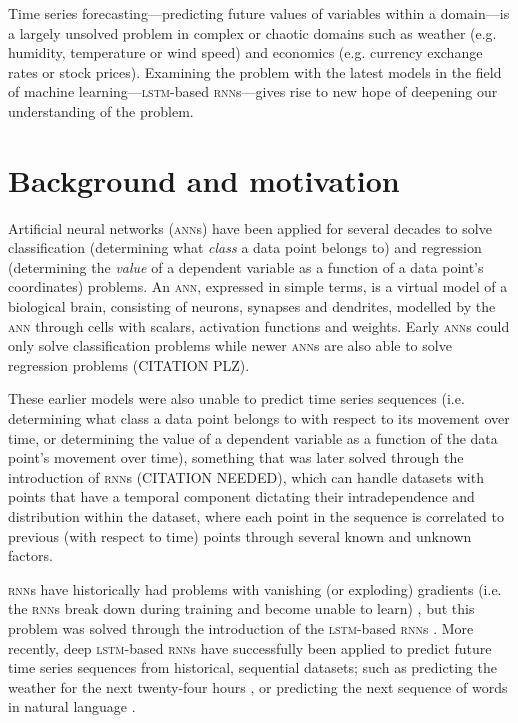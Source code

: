 Time series forecasting---predicting future values of variables within a domain---is a largely unsolved problem in complex or chaotic domains such as weather (e.g. humidity, temperature or wind speed) and economics (e.g. currency exchange rates or stock prices). Examining the problem with the latest models in the field of machine learning---\textsc{lstm}-based \textsc{rnn}s---gives rise to new hope of deepening our understanding of the problem.

\section{Background and motivation}
Artificial neural networks (\textsc{ann}s) have been applied for several decades to solve classification (determining what \textit{class} a data point belongs to) and regression (determining the \textit{value} of a dependent variable as a function of a data point's coordinates) problems. An \textsc{ann}, expressed in simple terms, is a virtual model of a biological brain, consisting of neurons, synapses and dendrites, modelled by the \textsc{ann} through cells with scalars, activation functions and weights. Early \textsc{ann}s could only solve classification problems \citep{rosenblatt1958} while newer \textsc{ann}s are also able to solve regression problems (CITATION PLZ).

These earlier models were also unable to predict time series sequences (i.e. determining what class a data point belongs to with respect to its movement over time, or determining the value of a dependent variable as a function of the data point's movement over time), something that was later solved through the introduction of \textsc{rnn}s (CITATION NEEDED), which can handle datasets with points that have a temporal component dictating their intradependence and distribution within the dataset, where each point in the sequence is correlated to previous (with respect to time) points through several known and unknown factors.

\textsc{rnn}s have historically had problems with vanishing (or exploding) gradients (i.e. the \textsc{rnn}s break down during training and become unable to learn) \citep{pascanu2012}, but this problem was solved through the introduction of the \textsc{lstm}-based \textsc{rnn}s \citep*{hochreiter1997}. More recently, deep \textsc{lstm}-based \textsc{rnn}s have successfully been applied to predict future time series sequences from historical, sequential datasets; such as predicting the weather for the next twenty-four hours \citep*{zaytar2016}, or predicting the next sequence of words in natural language \citep*{quoc2014}.

